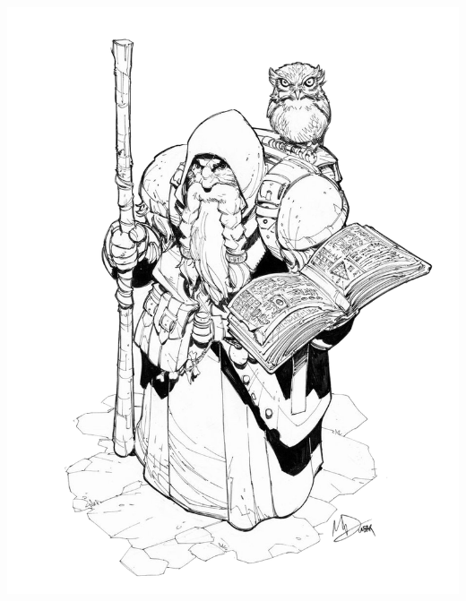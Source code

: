 \begin{multicols*}{2}

\begin{Figure}
\centering
\includegraphics[width=\textwidth]{img/wizard-2.png}
\end{Figure}
    
\end{multicols*}

    